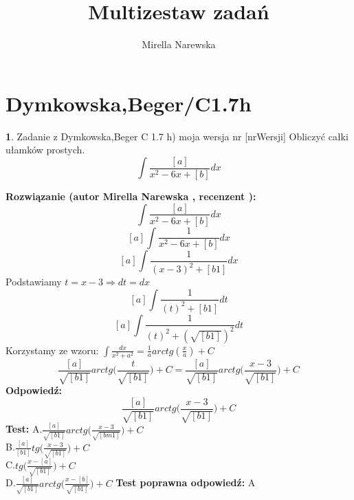 \documentclass[12pt, a4paper]{article}
\title{Multizestaw zadań}
\author{Mirella Narewska}
\date{}
\theoremstyle{definition} %
\newtheorem{zad}{}
\newcommand{\kategoria}[1]{\section{#1}} %
\newcommand{\zadStart}[1]{\begin{zad}#1\newline} %
\newcommand{\zadStop}{\end{zad}}   %
\newcommand{\rozwStart}[2]{\noindent \textbf{Rozwiązanie (autor #1 , recenzent #2): }\newline} %
\newcommand{\rozwStop}{\newline}                                            %
\newcommand{\odpStart}{\noindent \textbf{Odpowiedź:}\newline}    %
\newcommand{\odpStop}{\newline}                                             %
\newcommand{\testStart}{\noindent \textbf{Test:}\newline} %
\newcommand{\testStop}{\newline} %
\newcommand{\kluczStart}{\noindent \textbf{Test poprawna odpowiedź:}\newline} %
\newcommand{\kluczStop}{\newline} %
\begin{document}
\maketitle


\kategoria{Dymkowska,Beger/C1.7h}
\zadStart{Zadanie z Dymkowska,Beger C 1.7 h) moja wersja nr [nrWersji]}
Obliczyć całki ułamków prostych.$$\int\frac{[a]}{x^{2}-6x+[b]}dx$$
\zadStop
\rozwStart{Mirella Narewska}{}
$$\int\frac{[a]}{x^{2}-6x+[b]}dx$$
$$[a]\int\frac{1}{x^{2}-6x+[b]}dx$$
$$[a]\int\frac{1}{(x-3)^{2}+[b1]}dx$$
Podstawiamy $t=x-3\Rightarrow dt=dx$
$$[a]\int\frac{1}{(t)^{2}+[b1]}dt$$
$$[a]\int\frac{1}{(t)^{2}+(\sqrt{[b1]})^{2}}dt$$
Korzystamy ze wzoru: $\int\frac{dx}{x^{2}+a^{2}}=\frac{1}{a}arctg(\frac{x}{a})+C$
$$\frac{[a]}{\sqrt{[b1]}}arctg\bigg(\frac{t}{\sqrt{[b1]}}\bigg)+C=\frac{[a]}{\sqrt{[b1]}}arctg\bigg(\frac{x-3}{\sqrt{[b1]}}\bigg)+C$$
\rozwStop
\odpStart
$$\frac{[a]}{\sqrt{[b1]}}arctg\bigg(\frac{x-3}{\sqrt{[b1]}}\bigg)+C$$
\odpStop
\testStart
A.$\frac{[a]}{\sqrt{[b1]}}arctg\big(\frac{x-3}{\sqrt{[bm1]}}\big)+C$
\\B.$\frac{[a]}{[b1]}tg\big(\frac{x-3}{\sqrt{[b1]}}\big)+C$
\\C.$tg\big(\frac{x-[a]}{\sqrt{[b1]}}\big)+C$
\\D.$\frac{[a]}{\sqrt{[b1]}}arctg\big(\frac{x-[b]}{\sqrt{[b1]}}\big)+C$
\testStop
\kluczStart
A
\kluczStop
\end{document}
